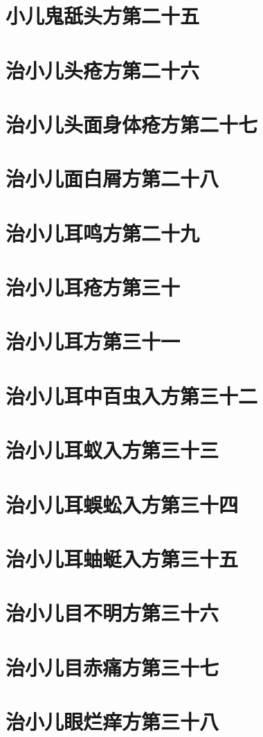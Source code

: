 \documentclass[a4paper,12pt,UTF8,twoside]{ctexbook}
\begin{document}
\chapter{小儿鬼舐头方第二十五}
\chapter{治小儿头疮方第二十六}
\chapter{治小儿头面身体疮方第二十七}
\chapter{治小儿面白屑方第二十八}
\chapter{治小儿耳鸣方第二十九}
\chapter{治小儿耳疮方第三十}
\chapter{治小儿耳方第三十一}
\chapter{治小儿耳中百虫入方第三十二}
\chapter{治小儿耳蚁入方第三十三}
\chapter{治小儿耳蜈蚣入方第三十四}
\chapter{治小儿耳蚰蜓入方第三十五}
\chapter{治小儿目不明方第三十六}
\chapter{治小儿目赤痛方第三十七}
\chapter{治小儿眼烂痒方第三十八}
\end{document}
